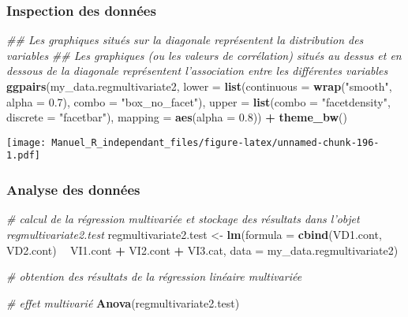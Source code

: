\documentclass[
]{book}
\newenvironment{Shaded}{\begin{snugshade}}{\end{snugshade}}
\newcommand{\CommentTok}[1]{\textcolor[rgb]{0.56,0.35,0.01}{\textit{#1}}}
\newcommand{\DataTypeTok}[1]{\textcolor[rgb]{0.13,0.29,0.53}{#1}}
\newcommand{\FloatTok}[1]{\textcolor[rgb]{0.00,0.00,0.81}{#1}}
\newcommand{\KeywordTok}[1]{\textcolor[rgb]{0.13,0.29,0.53}{\textbf{#1}}}
\newcommand{\NormalTok}[1]{#1}
\newcommand{\OperatorTok}[1]{\textcolor[rgb]{0.81,0.36,0.00}{\textbf{#1}}}
\newcommand{\StringTok}[1]{\textcolor[rgb]{0.31,0.60,0.02}{#1}}
\begin{document}
\hypertarget{inspection-des-donnuxe9es-22}{%
\subsubsection{Inspection des données}\label{inspection-des-donnuxe9es-22}}

\begin{Shaded}
\begin{Highlighting}[]
\CommentTok{## Les graphiques situés sur la diagonale représentent la distribution des variables}
\CommentTok{## Les graphiques (ou les valeurs de corrélation) situés au dessus et en dessous de la diagonale représentent l'association entre les différentes variables}
\KeywordTok{ggpairs}\NormalTok{(my_data.regmultivariate2,}
        \DataTypeTok{lower =} \KeywordTok{list}\NormalTok{(}\DataTypeTok{continuous =} \KeywordTok{wrap}\NormalTok{(}\StringTok{"smooth"}\NormalTok{, }\DataTypeTok{alpha =} \FloatTok{0.7}\NormalTok{), }\DataTypeTok{combo =} \StringTok{"box_no_facet"}\NormalTok{),}
        \DataTypeTok{upper =} \KeywordTok{list}\NormalTok{(}\DataTypeTok{combo =} \StringTok{"facetdensity"}\NormalTok{, }\DataTypeTok{discrete =} \StringTok{"facetbar"}\NormalTok{), }
        \DataTypeTok{mapping =} \KeywordTok{aes}\NormalTok{(}\DataTypeTok{alpha =} \FloatTok{0.8}\NormalTok{)) }\OperatorTok{+}\StringTok{ }\KeywordTok{theme_bw}\NormalTok{()}
\end{Highlighting}
\end{Shaded}

\texttt{[image: Manuel\_R\_independant\_files/figure-latex/unnamed-chunk-196-1.pdf]}

\hypertarget{analyse-des-donnuxe9es-23}{%
\subsubsection{Analyse des données}\label{analyse-des-donnuxe9es-23}}

\begin{Shaded}
\begin{Highlighting}[]
\CommentTok{# calcul de la régression multivariée et stockage des résultats dans l’objet regmultivariate2.test}
\NormalTok{regmultivariate2.test <-}\StringTok{ }\KeywordTok{lm}\NormalTok{(}\DataTypeTok{formula =} \KeywordTok{cbind}\NormalTok{(VD1.cont, VD2.cont) }\OperatorTok{~}\StringTok{ }\NormalTok{VI1.cont }\OperatorTok{+}\StringTok{ }\NormalTok{VI2.cont }\OperatorTok{+}\StringTok{ }\NormalTok{VI3.cat,}
                    \DataTypeTok{data =}\NormalTok{ my_data.regmultivariate2)}

\CommentTok{# obtention des résultats de la régression linéaire multivariée}

\CommentTok{# effet multivarié}
\KeywordTok{Anova}\NormalTok{(regmultivariate2.test)}
\end{Highlighting}
\end{Shaded}
\end{document}
